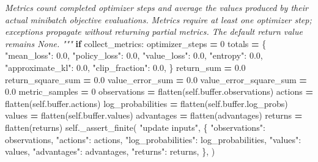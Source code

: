 \documentclass[
  chinese,
  11pt,
  letterpaper,
]{article}
\newenvironment{Shaded}{\begin{snugshade}}{\end{snugshade}}
\newcommand{\BuiltInTok}[1]{#1}
\newcommand{\CommentTok}[1]{\textcolor[rgb]{0.56,0.35,0.01}{\textit{#1}}}
\newcommand{\ControlFlowTok}[1]{\textcolor[rgb]{0.13,0.29,0.53}{\textbf{#1}}}
\newcommand{\DecValTok}[1]{\textcolor[rgb]{0.00,0.00,0.81}{#1}}
\newcommand{\FloatTok}[1]{\textcolor[rgb]{0.00,0.00,0.81}{#1}}
\newcommand{\NormalTok}[1]{#1}
\newcommand{\OperatorTok}[1]{\textcolor[rgb]{0.81,0.36,0.00}{\textbf{#1}}}
\newcommand{\StringTok}[1]{\textcolor[rgb]{0.31,0.60,0.02}{#1}}
\newcommand{\VariableTok}[1]{\textcolor[rgb]{0.00,0.00,0.00}{#1}}
\renewenvironment{Shaded}{\par\smallskip}{\par\smallskip}
\begin{document}
\begin{Shaded}
\begin{Highlighting}[]
\CommentTok{        Metrics count completed optimizer steps and average the values produced}
\CommentTok{        by their actual minibatch objective evaluations.}
\CommentTok{        Metrics require at least one optimizer step; exceptions propagate without}
\CommentTok{        returning partial metrics. The default return value remains \textasciigrave{}\textasciigrave{}None\textasciigrave{}\textasciigrave{}.}
\CommentTok{        """}
        \ControlFlowTok{if}\NormalTok{ collect\_metrics:}
\NormalTok{            optimizer\_steps }\OperatorTok{=} \DecValTok{0}
\NormalTok{            totals }\OperatorTok{=}\NormalTok{ \{}
                \StringTok{"mean\_loss"}\NormalTok{: }\FloatTok{0.0}\NormalTok{,}
                \StringTok{"policy\_loss"}\NormalTok{: }\FloatTok{0.0}\NormalTok{,}
                \StringTok{"value\_loss"}\NormalTok{: }\FloatTok{0.0}\NormalTok{,}
                \StringTok{"entropy"}\NormalTok{: }\FloatTok{0.0}\NormalTok{,}
                \StringTok{"approximate\_kl"}\NormalTok{: }\FloatTok{0.0}\NormalTok{,}
                \StringTok{"clip\_fraction"}\NormalTok{: }\FloatTok{0.0}\NormalTok{,}
\NormalTok{            \}}
\NormalTok{            return\_sum }\OperatorTok{=} \FloatTok{0.0}
\NormalTok{            return\_square\_sum }\OperatorTok{=} \FloatTok{0.0}
\NormalTok{            value\_error\_sum }\OperatorTok{=} \FloatTok{0.0}
\NormalTok{            value\_error\_square\_sum }\OperatorTok{=} \FloatTok{0.0}
\NormalTok{            metric\_samples }\OperatorTok{=} \DecValTok{0}
\NormalTok{        observations }\OperatorTok{=}\NormalTok{ flatten(}\VariableTok{self}\NormalTok{.}\BuiltInTok{buffer}\NormalTok{.observations)}
\NormalTok{        actions }\OperatorTok{=}\NormalTok{ flatten(}\VariableTok{self}\NormalTok{.}\BuiltInTok{buffer}\NormalTok{.actions)}
\NormalTok{        log\_probabilities }\OperatorTok{=}\NormalTok{ flatten(}\VariableTok{self}\NormalTok{.}\BuiltInTok{buffer}\NormalTok{.log\_probs)}
\NormalTok{        values }\OperatorTok{=}\NormalTok{ flatten(}\VariableTok{self}\NormalTok{.}\BuiltInTok{buffer}\NormalTok{.values)}
\NormalTok{        advantages }\OperatorTok{=}\NormalTok{ flatten(advantages)}
\NormalTok{        returns }\OperatorTok{=}\NormalTok{ flatten(returns)}
        \VariableTok{self}\NormalTok{.\_assert\_finite(}
            \StringTok{"update inputs"}\NormalTok{,}
\NormalTok{            \{}
                \StringTok{"observations"}\NormalTok{: observations,}
                \StringTok{"actions"}\NormalTok{: actions,}
                \StringTok{"log\_probabilities"}\NormalTok{: log\_probabilities,}
                \StringTok{"values"}\NormalTok{: values,}
                \StringTok{"advantages"}\NormalTok{: advantages,}
                \StringTok{"returns"}\NormalTok{: returns,}
\NormalTok{            \},}
\NormalTok{        )}


\end{Highlighting}
\end{Shaded}
\end{document}
